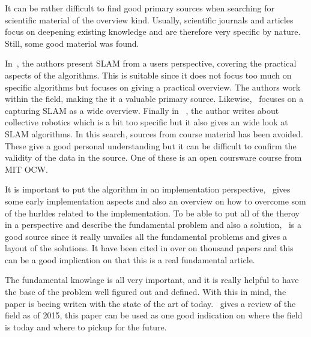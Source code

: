 It can be rather difficult to find good primary sources when searching for
scientific material of the overview kind. Usually, scientific journals and
articles focus on deepening existing knowledge and are therefore very specific
by nature. Still, some good material was found.

In~\cite{Frese2010}, the authors present SLAM from a users perspective, covering
the practical aspects of the algorithms. This is suitable since it does not
focus too much on specific algorithms but focuses on giving a practical
overview. The authors work within the field, making the it a valuable primary
source. Likewise,~\cite{5769022} focuses on a capturing SLAM as a wide overview.
Finally in ~\cite{Kernbach20131}, the author writes about collective robotics
which is a bit too specific but it also gives an wide look at SLAM algorithms.
In this search, sources from course material has been avoided. These give a good
personal understanding but it can be difficult to confirm the validity of the
data in the source. One of these is an open coursware course from MIT OCW.

It is important to put the algorithm in an implementation
perspective,~\cite{844732} gives some early implementation aspects and also an
overview on how to overcome som of the hurldes related to the implementation.
To be able to put all of the theroy in a perspective and describe the
fundamental problem and also a solution,~\cite{938381} is a good source since it
really unvailes all the fundamental problems and gives a layout of the
solutions. It have been cited in over on thousand papers and this can be a good
implication on that this is a real fundamental article.

The fundamental knowlage is all very important, and it is really helpful to
have the base of the problem well figured out and defined. With this in mind,
the paper is beeing writen with the state of the art of today.~\cite{7482163}
gives a review of the field as of 2015, this paper can be used as one good
indication on where the field is today and where to pickup for the future.
